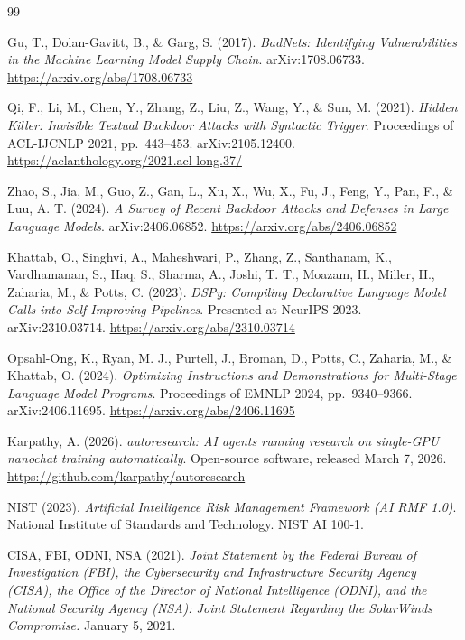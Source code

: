 \documentclass[11pt]{article}
\begin{document}
\begin{thebibliography}{99}

Gu, T., Dolan-Gavitt, B., \& Garg, S. (2017).
\textit{BadNets: Identifying Vulnerabilities in the Machine Learning Model Supply Chain}.
arXiv:1708.06733. \url{https://arxiv.org/abs/1708.06733}

Qi, F., Li, M., Chen, Y., Zhang, Z., Liu, Z., Wang, Y., \& Sun, M. (2021).
\textit{Hidden Killer: Invisible Textual Backdoor Attacks with Syntactic Trigger}.
Proceedings of ACL-IJCNLP 2021, pp.\ 443--453.
arXiv:2105.12400. \url{https://aclanthology.org/2021.acl-long.37/}

Zhao, S., Jia, M., Guo, Z., Gan, L., Xu, X., Wu, X., Fu, J.,
Feng, Y., Pan, F., \& Luu, A. T. (2024).
\textit{A Survey of Recent Backdoor Attacks and Defenses in Large Language Models}.
arXiv:2406.06852. \url{https://arxiv.org/abs/2406.06852}

Khattab, O., Singhvi, A., Maheshwari, P., Zhang, Z., Santhanam, K.,
Vardhamanan, S., Haq, S., Sharma, A., Joshi, T. T., Moazam, H.,
Miller, H., Zaharia, M., \& Potts, C. (2023).
\textit{DSPy: Compiling Declarative Language Model Calls into Self-Improving Pipelines}.
Presented at NeurIPS 2023. arXiv:2310.03714.
\url{https://arxiv.org/abs/2310.03714}

Opsahl-Ong, K., Ryan, M. J., Purtell, J., Broman, D., Potts, C.,
Zaharia, M., \& Khattab, O. (2024).
\textit{Optimizing Instructions and Demonstrations for Multi-Stage Language Model Programs}.
Proceedings of EMNLP 2024, pp.\ 9340--9366. arXiv:2406.11695.
\url{https://arxiv.org/abs/2406.11695}

Karpathy, A. (2026).
\textit{autoresearch: AI agents running research on single-GPU nanochat training automatically}.
Open-source software, released March 7, 2026.
\url{https://github.com/karpathy/autoresearch}

NIST (2023).
\textit{Artificial Intelligence Risk Management Framework (AI RMF 1.0)}.
National Institute of Standards and Technology. NIST AI 100-1.

CISA, FBI, ODNI, NSA (2021).
\textit{Joint Statement by the Federal Bureau of Investigation (FBI), the Cybersecurity and
Infrastructure Security Agency (CISA), the Office of the Director of National Intelligence
(ODNI), and the National Security Agency (NSA): Joint Statement Regarding the SolarWinds
Compromise.} January 5, 2021.

\end{thebibliography}
\end{document}
